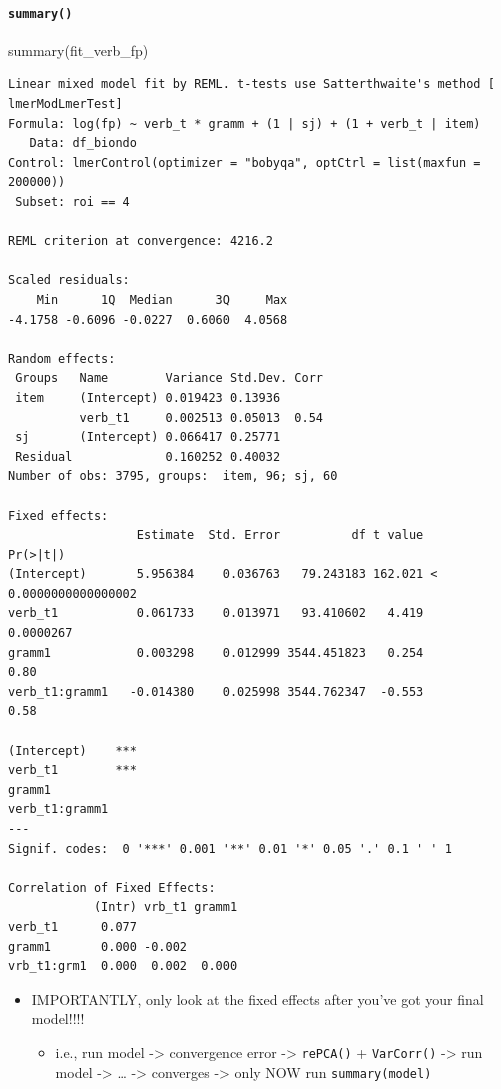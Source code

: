 \documentclass[
  letterpaper,
  DIV=11,
  numbers=noendperiod]{scrartcl}
\let\oldparagraph\paragraph
\renewcommand{\paragraph}[1]{\oldparagraph{#1}\mbox{}}
\newenvironment{Shaded}{\begin{snugshade}}{\end{snugshade}}
\newcommand{\FunctionTok}[1]{\textcolor[rgb]{0.28,0.35,0.67}{#1}}
\newcommand{\NormalTok}[1]{\textcolor[rgb]{0.00,0.23,0.31}{#1}}
\providecommand{\tightlist}{%
  \setlength{\itemsep}{0pt}\setlength{\parskip}{0pt}}\usepackage{longtable,booktabs,array}
\begin{document}
\hypertarget{summary}{%
\paragraph{\texorpdfstring{\texttt{summary()}}{summary()}}\label{summary}}

\begin{Shaded}
\begin{Highlighting}[]
\FunctionTok{summary}\NormalTok{(fit\_verb\_fp)}
\end{Highlighting}
\end{Shaded}

\begin{verbatim}
Linear mixed model fit by REML. t-tests use Satterthwaite's method [
lmerModLmerTest]
Formula: log(fp) ~ verb_t * gramm + (1 | sj) + (1 + verb_t | item)
   Data: df_biondo
Control: lmerControl(optimizer = "bobyqa", optCtrl = list(maxfun = 200000))
 Subset: roi == 4

REML criterion at convergence: 4216.2

Scaled residuals: 
    Min      1Q  Median      3Q     Max 
-4.1758 -0.6096 -0.0227  0.6060  4.0568 

Random effects:
 Groups   Name        Variance Std.Dev. Corr
 item     (Intercept) 0.019423 0.13936      
          verb_t1     0.002513 0.05013  0.54
 sj       (Intercept) 0.066417 0.25771      
 Residual             0.160252 0.40032      
Number of obs: 3795, groups:  item, 96; sj, 60

Fixed effects:
                  Estimate  Std. Error          df t value             Pr(>|t|)
(Intercept)       5.956384    0.036763   79.243183 162.021 < 0.0000000000000002
verb_t1           0.061733    0.013971   93.410602   4.419            0.0000267
gramm1            0.003298    0.012999 3544.451823   0.254                 0.80
verb_t1:gramm1   -0.014380    0.025998 3544.762347  -0.553                 0.58
                  
(Intercept)    ***
verb_t1        ***
gramm1            
verb_t1:gramm1    
---
Signif. codes:  0 '***' 0.001 '**' 0.01 '*' 0.05 '.' 0.1 ' ' 1

Correlation of Fixed Effects:
            (Intr) vrb_t1 gramm1
verb_t1      0.077              
gramm1       0.000 -0.002       
vrb_t1:grm1  0.000  0.002  0.000
\end{verbatim}

\begin{itemize}
\tightlist
\item
  IMPORTANTLY, only look at the fixed effects after you've got your
  final model!!!!

  \begin{itemize}
  \tightlist
  \item
    i.e., run model -\textgreater{} convergence error -\textgreater{}
    \texttt{rePCA()} + \texttt{VarCorr()} -\textgreater{} run model
    -\textgreater{} \ldots{} -\textgreater{} converges -\textgreater{}
    only NOW run \texttt{summary(model)}
  \end{itemize}
\end{itemize}
\end{document}
